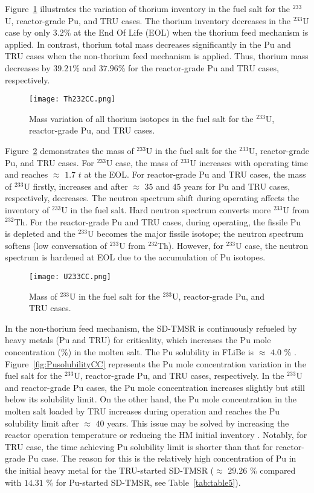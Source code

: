 Figure~\ref{fig:Th232CC} illustrates the variation of thorium inventory in the 
fuel salt for the $^{233}$U, reactor-grade Pu, and TRU cases. The thorium inventory 
decreases in the $^{233}$U case by only $3.2$\% at the End Of Life (EOL) when the thorium 
feed mechanism is applied. 
In contrast, thorium total mass decreases significantly in the Pu and TRU cases when the non-thorium 
feed mechanism is applied. Thus, thorium mass decreases by $39.21$\% and 
$37.96$\% for the reactor-grade Pu and TRU cases, respectively.
\begin{figure}
	\centering
	\texttt{[image: Th232CC.png]}
	\caption{Mass variation of all thorium isotopes in the fuel salt for the $^{233}$U, reactor-grade Pu, and TRU cases.}
	\label{fig:Th232CC}
\end{figure}

Figure~\ref{fig:U233CC} demonstrates the mass of $^{233}$U in the fuel salt for the $^{233}$U, reactor-grade Pu, and TRU cases. For $^{233}$U case, the mass of $^{233}$U increases with operating time and reaches $\approx$ $1.7$ $t$ at the EOL. For reactor-grade Pu and TRU cases, the mass of $^{233}$U firstly, increases and after $\approx$ $35$ and $45$ years for Pu and TRU cases, respectively, decreases. The neutron spectrum shift during operating affects the inventory of $^{233}$U in the fuel salt. Hard neutron spectrum converts more $^{233}$U from $^{232}$Th. For the reactor-grade Pu and TRU cases, during operating, the fissile Pu is depleted and the $^{233}$U becomes the major fissile isotope; the neutron spectrum softens (low conversation of $^{233}$U from $^{232}$Th). However, for $^{233}$U case, the neutron spectrum is hardened at EOL due to the accumulation of Pu isotopes.

\begin{figure}
	\centering
	\texttt{[image: U233CC.png]}
	\caption{Mass of $^{233}$U in the fuel salt for the $^{233}$U, reactor-grade Pu, and TRU cases.}
	\label{fig:U233CC}
\end{figure}

In the non-thorium feed mechanism, the SD-TMSR is continuously refueled by heavy metals (Pu and TRU) for 
criticality, which increases the Pu mole concentration (\%) in the molten salt. 
The Pu solubility in FLiBe is 
$\approx$ $4.0$ \% \cite{ignatiev2012progress,sood1975plutonium}. 
Figure~\ref{fig:PusolubilityCC} represents the Pu mole concentration variation in the fuel salt 
for the $^{233}$U, reactor-grade Pu, and TRU cases, respectively. In the $^{233}$U and reactor-grade Pu cases, the Pu mole concentration increases 
slightly but still below its solubility limit. On the other hand, the Pu 
mole concentration in the molten salt loaded by TRU increases during operation and 
reaches the Pu solubility limit after $\approx$ $40$ years. This issue may 
be solved by increasing the reactor operation temperature or reducing the 
HM initial inventory \cite{zou2018transition}. Notably, for TRU case, the time achieving Pu solubility limit is shorter than that for reactor-grade Pu case. The reason for this is the relatively high concentration of Pu in the initial heavy metal for the TRU-started SD-TMSR ($\approx$ $29.26$ \% compared with $14.31$ \% for Pu-started SD-TMSR, see Table~\ref{tab:table5}).

